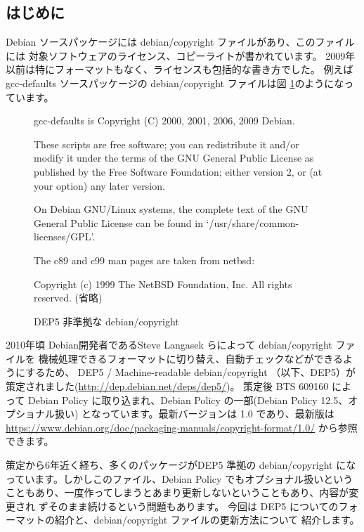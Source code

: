 \documentclass[mingoth,a4paper]{jsarticle}
\begin{document}
\subsection{はじめに}

Debian ソースパッケージには debian/copyright ファイルがあり、このファイルには
対象ソフトウェアのライセンス、コピーライトが書かれています。
2009年以前は特にフォーマットもなく、ライセンスも包括的な書き方でした。
例えば gcc-defaults ソースパッケージの debian/copyright ファイルは図
\ref{fig:non-dep5-copyright}のようになっています。

\begin{figure}[htbp]
\begin{center}
\begin{commandline}
gcc-defaults is Copyright (C) 2000, 2001, 2006, 2009 Debian.

These scripts are free software; you can redistribute it and/or modify it
under the terms of the GNU General Public License as published by the
Free Software Foundation; either version 2, or (at your option) any
later version.

On Debian GNU/Linux systems, the complete text of the GNU General
Public License can be found in `/usr/share/common-licenses/GPL'.

The c89 and c99 man pages are taken from netbsd:

Copyright (c) 1999 The NetBSD Foundation, Inc.
All rights reserved.
(省略)
\end{commandline}
\end{center}
\caption{DEP5 非準拠な debian/copyright}
\label{fig:non-dep5-copyright}
\end{figure}


2010年頃 Debian開発者であるSteve Langasek らによって debian/copyright ファイルを
機械処理できるフォーマットに切り替え、自動チェックなどができるようにするため、
DEP5 / Machine-readable debian/copyright （以下、DEP5）が策定されました(\url{http://dep.debian.net/deps/dep5/})。
策定後 BTS 609160 によって Debian Policy に取り込まれ、Debian Policy の一部(Debian Policy 12.5、オプショナル扱い)
となっています。最新バージョンは 1.0 であり、最新版は
\url{https://www.debian.org/doc/packaging-manuals/copyright-format/1.0/}
から参照できます。

策定から6年近く経ち、多くのパッケージがDEP5 準拠の debian/copyright 
になっています。しかしこのファイル、Debian Policy でもオプショナル扱いという
こともあり、一度作ってしまうとあまり更新しないということもあり、内容が変更され
ずそのまま続けるという問題もあります。
今回は DEP5 についてのフォーマットの紹介と、debian/copyright ファイルの更新方法について
紹介します。
\end{document}
